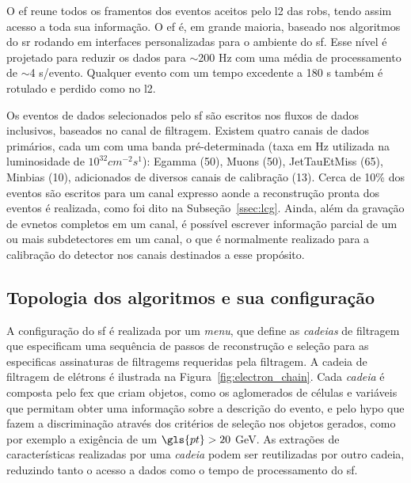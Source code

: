 O \gls{ef} reune todos os framentos dos eventos aceitos pelo \gls{l2} das
\glspl{rob}, tendo assim acesso a toda sua informação. O \gls{ef} é, em grande
maioria, baseado nos algoritmos do \acrlong{sr} rodando em interfaces
personalizadas para o ambiente do \gls{sf}. Esse nível é projetado para reduzir
os dados para $\sim$200 Hz com uma média de processamento de $\sim$4 s/evento.
Qualquer evento com um tempo excedente a 180 s também é rotulado e perdido como
no \gls{l2}. 

Os eventos de dados selecionados pelo \gls{sf} são escritos nos fluxos de dados
inclusivos, baseados no canal de filtragem. Existem quatro canais de dados
primários, cada um com uma banda pré-determinada (taxa em Hz utilizada na
luminosidade de $10^{32}cm^{-2}s^{1}$): Egamma (50),
Muons (50), JetTauEtMiss (65), Minbias (10), adicionados de diversos canais
de calibração (13). Cerca de 10\% dos eventos são escritos 
para um canal expresso aonde a reconstrução pronta dos eventos é realizada, como foi dito na
Subseção~\ref{ssec:lcg}. Ainda, além da gravação de evnetos completos em um
canal, é possível escrever informação parcial de um ou mais subdetectores em um
canal, o que é normalmente realizado para a calibração do detector nos canais
destinados a esse propósito.


\subsection{Topologia dos algoritmos e sua configuração}
\label{ssec:alg_topo}


A configuração do \gls{sf} é realizada por um \emph{menu}, que define as
\emph{cadeias} de filtragem que especificam uma sequência de passos de reconstrução e
seleção para as especificas assinaturas de filtragems requeridas pela filtragem.
A cadeia de filtragem de elétrons é ilustrada na Figura~\ref{fig:electron_chain}.
Cada \emph{cadeia} é composta pelo \gls{fex} que criam objetos,
como os aglomerados de células e variáveis que permitam obter uma informação
sobre a descrição do evento, e pelo \gls{hypo} que fazem a discriminação através dos
critérios de seleção nos objetos gerados, como por exemplo a exigência de um
$\gls{pt} > 20$ GeV. As extrações de características realizadas por uma
\emph{cadeia} podem ser reutilizadas por outro cadeia, reduzindo tanto o acesso
a dados como o tempo de processamento do \gls{sf}.

